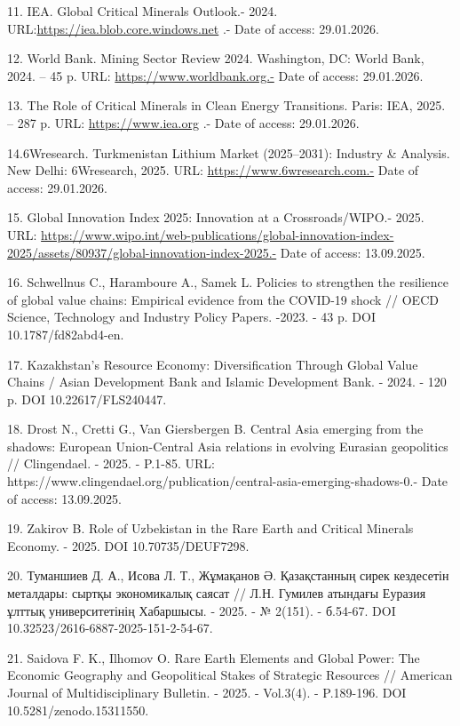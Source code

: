 \begin{refs}
11. IEA. Global Critical Minerals Outlook.- 2024.
URL:\href{https://iea.blob.core.windows.net/assets/ee01701d-1d5c-4ba8-9df6-abeeac9de99a/GlobalCriticalMineralsOutlook2024.pdf}{https://iea.blob.core.windows.net} .- Date of access: 29.01.2026.

12. World Bank. Mining Sector Review 2024. Washington, DC: World Bank,
2024. -- 45 p. URL: \url{https://www.worldbank.org.-} Date of access:
29.01.2026.

13. The Role of Critical Minerals in Clean Energy Transitions. Paris:
IEA, 2025. -- 287 p. URL:
\href{https://www.iea.org/reports/the-role-of-critical-minerals-in-clean-energy-transitions}{https://www.iea.org} .-
Date of access: 29.01.2026.

14.6Wresearch. Turkmenistan Lithium Market (2025--2031): Industry \&
Analysis. New Delhi: 6Wresearch, 2025. URL:
\url{https://www.6wresearch.com.-} Date of access: 29.01.2026.

15. Global Innovation Index 2025: Innovation at a Crossroads/WIPO.- 2025.
URL:
\url{https://www.wipo.int/web-publications/global-innovation-index-2025/assets/80937/global-innovation-index-2025.-}
Date of access: 13.09.2025.

16. Schwellnus C., Haramboure A., Samek L. Policies to strengthen the
resilience of global value chains: Empirical evidence from the COVID-19
shock // OECD Science, Technology and Industry Policy Papers. -2023. -
43 p. DOI 10.1787/fd82abd4-en.

17. Kazakhstan's Resource Economy: Diversification Through Global Value
Chains / Asian Development Bank and Islamic Development Bank. - 2024. -
120 p. DOI 10.22617/FLS240447.

18. Drost N., Cretti G., Van Giersbergen B. Central Asia emerging from
the shadows: European Union-Central Asia relations in evolving Eurasian
geopolitics // Clingendael. - 2025. - P.1-85. URL:
https://www.clingendael.org/publication/central-asia-emerging-shadows-0.-
Date of access: 13.09.2025.

19. Zakirov B. Role of Uzbekistan in the Rare Earth and Critical
Minerals Economy. - 2025. DOI 10.70735/DEUF7298.

20. Туманшиев Д. А., Исова Л. Т., Жұмақанов Ә. Қазақстанның сирек
кездесетін металдары: сыртқы экономикалық саясат // Л.Н. Гумилев
атындағы Еуразия ұлттық университетінің Хабаршысы. - 2025. - № 2(151). -
б.54-67. DOI 10.32523/2616-6887-2025-151-2-54-67.

21. Saidova F. K., Ilhomov O. Rare Earth Elements and Global Power: The
Economic Geography and Geopolitical Stakes of Strategic Resources //
American Journal of Multidisciplinary Bulletin. - 2025. - Vol.3(4). -
P.189-196. DOI 10.5281/zenodo.15311550.
\end{refs}

